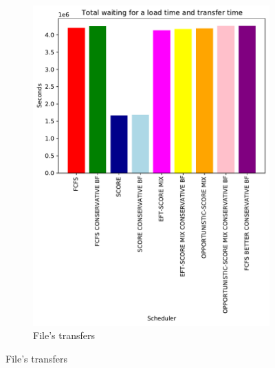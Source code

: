 \documentclass[a4paper]{article}
\begin{document}
\begin{figure}[H]\centering
\begin{subfigure}[b]{0.4\linewidth}\centering\includegraphics[width=0.9\linewidth]{MBSS/plot/Results_FCFS_Score_Backfill_2022-04-07->2022-04-09_V9271_Total_waiting_for_a_load_time_and_transfer_time_450_128_32_256_4_1024.pdf}\caption{File's transfers}\end{subfigure}

\end{figure}
\end{document}
